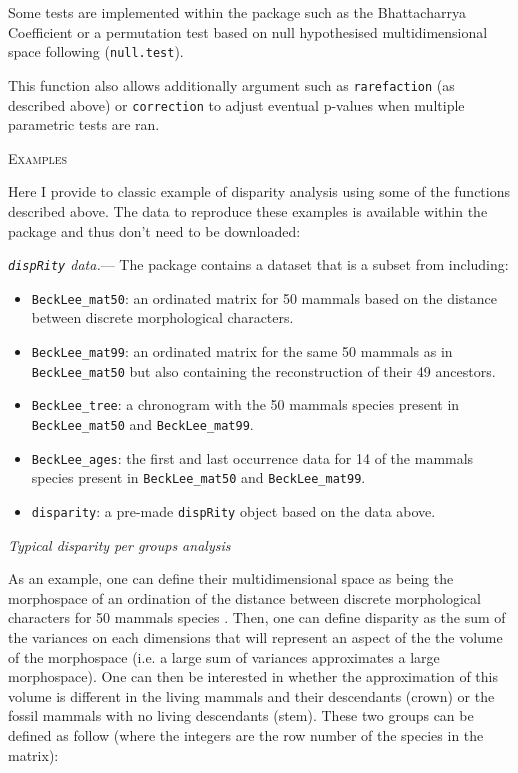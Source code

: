 \documentclass[12pt,letterpaper]{article}
\renewcommand{\section}[1]{%
\bigskip
\begin{center}
\begin{Large}
\normalfont\scshape #1
\medskip
\end{Large}
\end{center}}
\renewcommand{\subsection}[1]{%
\bigskip
\begin{center}
\begin{large}
\normalfont\itshape #1
\end{large}
\end{center}}
\renewcommand{\subsubsection}[1]{%
\vspace{2ex}
\noindent
\textit{#1.}---}
\newcommand{\disp}{\texttt{dispRity} }
\begin{document}
Some tests are implemented within the package such as the Bhattacharrya Coefficient \citep[\texttt{bhatt.coeff}][]{Bhattacharyya,GuillermeCooper} or a permutation test based on null hypothesised multidimensional space following \cite{diaz2016global} (\texttt{null.test}).

This function also allows additionally argument such as \texttt{rarefaction} (as described above) or \texttt{correction} to adjust eventual p-values when multiple parametric tests are ran.

\section{Examples}
Here I provide to classic example of disparity analysis using some of the functions described above.
The data to reproduce these examples is available within the package and thus don't need to be downloaded:

\subsubsection{\disp data}
The package contains a dataset that is a subset from \cite{beckancient2014} including:

\begin{itemize}
    \item \texttt{BeckLee\_mat50}: an ordinated matrix for 50 mammals based on the distance between discrete morphological characters.
    \item \texttt{BeckLee\_mat99}: an ordinated matrix for the same 50 mammals as in \texttt{BeckLee\_mat50} but also containing the reconstruction of their 49 ancestors.
    \item \texttt{BeckLee\_tree}: a chronogram with the 50 mammals species present in \texttt{BeckLee\_mat50} and \texttt{BeckLee\_mat99}.
    \item \texttt{BeckLee\_ages}: the first and last occurrence data for 14 of the mammals species present in \texttt{BeckLee\_mat50} and \texttt{BeckLee\_mat99}.
    \item \texttt{disparity}: a pre-made \disp object based on the data above.
\end{itemize}

\subsection{Typical disparity per groups analysis}

As an example, one can define their multidimensional space as being the morphospace of an ordination of the distance between discrete morphological characters for 50 mammals species \citep[from][]{beckancient2014}.
Then, one can define disparity as the sum of the variances on each dimensions \citep{Wills1994} that will represent an aspect of the the volume of the morphospace (i.e. a large sum of variances approximates a large morphospace).
One can then be interested in whether the approximation of this volume is different in the living mammals and their descendants (crown) or the fossil mammals with no living descendants (stem).
These two groups can be defined as follow (where the integers are the row number of the species in the matrix):
\end{document}
